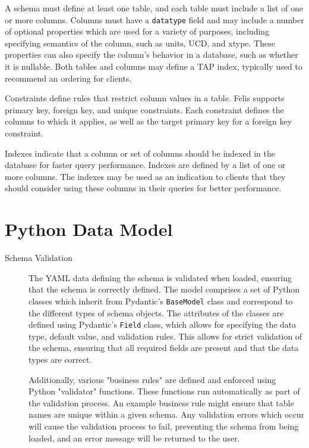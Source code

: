 \documentclass[11pt,twoside]{article}
\begin{document}
A schema must define at least one table, and each table must include a list of one or more columns.
Columns must have a \texttt{datatype} field and may include a number of optional properties which are used for a variety of purposes, including specifying semantics of the column, such as units, UCD, and xtype.
These properties can also specify the column's behavior in a database, such as whether it is nullable.
Both tables and columns may define a TAP index, typically used to recommend an ordering for clients.

Constraints define rules that restrict column values in a table.
Felis supports primary key, foreign key, and unique constraints.
Each constraint defines the columns to which it applies, as well as the target primary key for a foreign key constraint.

Indexes indicate that a column or set of columns should be indexed in the database for faster query performance.
Indexes are defined by a list of one or more columns.
The indexes may be used as an indication to clients that they should consider using these columns in their queries for better performance.

\section{Python Data Model}

\begin{description}
    \item[Schema Validation]
    The YAML data defining the schema is validated when loaded, ensuring that the schema is correctly defined.
    The model comprises a set of Python classes which inherit from Pydantic's \texttt{BaseModel} class and correspond to the different types of schema objects.
    The attributes of the classes are defined using Pydantic's \texttt{Field} class, which allows for specifying the data type, default value, and validation rules.
    This allows for strict validation of the schema, ensuring that all required fields are present and that the data types are correct.

    Additionally, various "business rules" are defined and enforced using Python "validator" functions.
    These functions run automatically as part of the validation process.
    An example business rule might ensure that table names are unique within a given schema.
    Any validation errors which occur will cause the validation process to fail, preventing the schema from being loaded, and an error message will be returned to the user.
\end{description}
\end{document}

